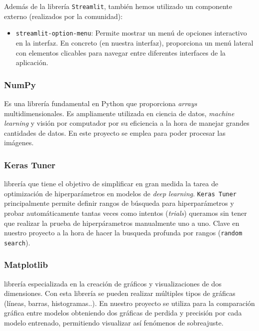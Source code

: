 Además de la librería \texttt{Streamlit}, también hemos utilizado un componente externo (realizados por la comunidad):

\begin{itemize}
\tightlist
    \item \texttt{streamlit-option-menu}: Permite mostrar un menú de opciones interactivo en la interfaz. En concreto (en nuestra interfaz), proporciona un menú lateral con elementos clicables para navegar entre diferentes interfaces de la aplicación.
\end{itemize}

\subsubsection{NumPy}


Es una librería fundamental en Python que proporciona \textit{arrays} multidimensionales. Es ampliamente utilizada en ciencia de datos, \textit{machine learning} y visión por computador por su eficiencia a la hora de manejar grandes cantidades de datos. En este proyecto se emplea para poder procesar las imágenes.

\subsubsection{Keras Tuner}


librería que tiene el objetivo de simplificar en gran medida la tarea de optimización de hiperparámetros en modelos de \textit{deep learning}. \texttt{Keras Tuner} principalmente permite  definir rangos de búsqueda para hiperparámetros y probar automáticamente tantas veces como intentos (\textit{trials}) queramos sin tener que realizar la prueba de hiperpárametros manualmente uno a uno. Clave en nuestro proyecto a la hora de hacer la busqueda profunda por rangos (\texttt{random search}).

\subsubsection{Matplotlib}


librería especializada en la creación de gráficos y visualizaciones de dos dimensiones. Con esta librería se pueden realizar múltiples tipos de gráficas (líneas, barras, histogramas..). En nuestro proyecto se utiliza para la comparación gráfica entre modelos obteniendo dos gráficas de perdida y precisión por cada modelo entrenado, permitiendo visualizar así fenómenos de sobreajuste.

